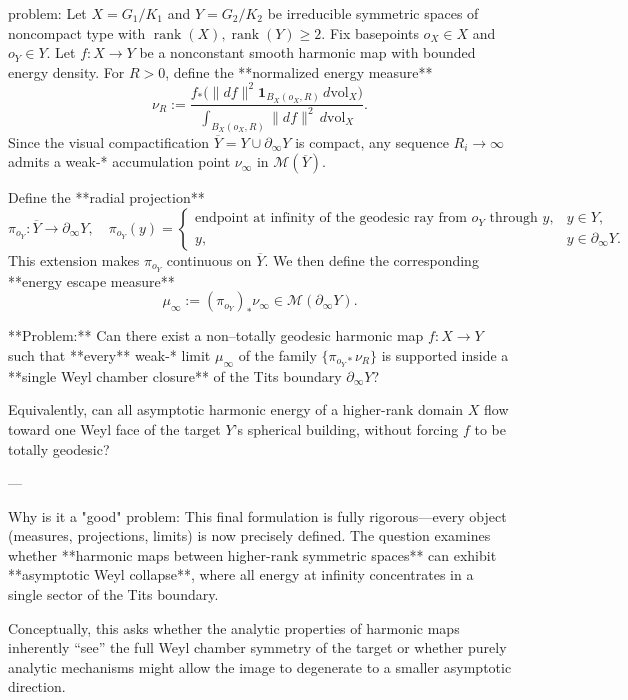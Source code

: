 problem:  
Let \( X = G_1/K_1 \) and \( Y = G_2/K_2 \) be irreducible symmetric spaces of noncompact type with \(\operatorname{rank}(X), \operatorname{rank}(Y) \ge 2\).  
Fix basepoints \(o_X \in X\) and \(o_Y \in Y\).  
Let \( f : X \to Y \) be a nonconstant smooth harmonic map with bounded energy density.  
For \( R>0 \), define the **normalized energy measure**  
\[
\nu_R := \frac{f_*\!\big( \|df\|^2 \mathbf{1}_{B_X(o_X,R)}\, d\mathrm{vol}_X \big)}{\int_{B_X(o_X,R)} \|df\|^2\, d\mathrm{vol}_X}.
\]
Since the visual compactification \(\overline{Y} = Y \cup \partial_\infty Y\) is compact, any sequence \(R_i \to \infty\) admits a weak-* accumulation point \(\nu_\infty\) in \(\mathcal{M}(\overline{Y})\).

Define the **radial projection**
\[
\pi_{o_Y} : \overline{Y} \longrightarrow \partial_\infty Y, \quad 
\pi_{o_Y}(y) =
\begin{cases}
  \text{endpoint at infinity of the geodesic ray from } o_Y \text{ through } y, & y \in Y,\\[4pt]
  y, & y \in \partial_\infty Y. 
\end{cases}
\]
This extension makes \(\pi_{o_Y}\) continuous on \(\overline{Y}\).  
We then define the corresponding **energy escape measure**
\[
\mu_\infty := (\pi_{o_Y})_*\nu_\infty \in \mathcal{M}(\partial_\infty Y).
\]

**Problem:**  
Can there exist a non–totally geodesic harmonic map \( f : X \to Y \) such that **every** weak-* limit \(\mu_\infty\) of the family \(\{\pi_{o_Y*}\nu_R\}\) is supported inside a **single Weyl chamber closure** of the Tits boundary \(\partial_\infty Y\)?  

Equivalently, can all asymptotic harmonic energy of a higher-rank domain \(X\) flow toward one Weyl face of the target \(Y\)’s spherical building, without forcing \(f\) to be totally geodesic?

---

Why is it a "good" problem:  
This final formulation is fully rigorous—every object (measures, projections, limits) is now precisely defined. The question examines whether **harmonic maps between higher-rank symmetric spaces** can exhibit **asymptotic Weyl collapse**, where all energy at infinity concentrates in a single sector of the Tits boundary.  

Conceptually, this asks whether the analytic properties of harmonic maps inherently “see” the full Weyl chamber symmetry of the target or whether purely analytic mechanisms might allow the image to degenerate to a smaller asymptotic direction.  

